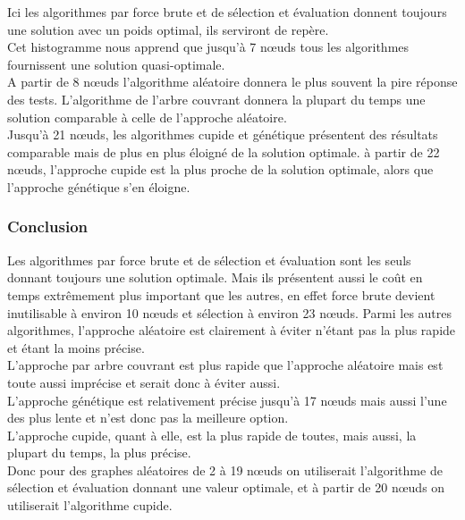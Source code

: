 \documentclass[10pt,a4paper]{report}
\begin{document}
			\begin{flushleft}
			Ici les algorithmes par force brute et de sélection et évaluation donnent toujours une solution avec un poids optimal, ils serviront de repère.\\
			Cet histogramme nous apprend que jusqu'à 7 nœuds tous les algorithmes fournissent une solution quasi-optimale.\\
			A partir de 8 nœuds l'algorithme aléatoire donnera le plus souvent la pire réponse des tests. L'algorithme de l'arbre couvrant donnera la plupart du temps une solution comparable à celle de l'approche aléatoire.\\
			Jusqu'à 21 nœuds, les algorithmes cupide et génétique présentent des résultats comparable mais de plus en plus éloigné de la solution optimale. à partir de 22 nœuds, l'approche cupide est la plus proche de la solution optimale, alors que l'approche génétique s'en éloigne.
			\end{flushleft}
					
		\subsubsection{Conclusion}
		\begin{flushleft}
		Les algorithmes par force brute et de sélection et évaluation sont les seuls donnant toujours une solution optimale. Mais ils présentent aussi le coût en temps extrêmement plus important que les autres, en effet force brute devient inutilisable à environ 10 nœuds et sélection à environ 23 nœuds.
		Parmi les autres algorithmes, l'approche aléatoire est clairement à éviter n'étant pas la plus rapide et étant la moins précise.\\
		L'approche par arbre couvrant est plus rapide que l'approche aléatoire mais est toute aussi imprécise et serait donc à éviter aussi.\\
		L'approche génétique est relativement précise jusqu'à 17 nœuds mais aussi l'une des plus lente et n'est donc pas la meilleure option.\\
		L'approche cupide, quant à elle, est la plus rapide de toutes, mais aussi, la plupart du temps, la plus précise.\\
		
		Donc pour des graphes aléatoires de 2 à 19 nœuds on utiliserait l'algorithme de sélection et évaluation donnant une valeur optimale, et à partir de 20 nœuds on utiliserait l'algorithme cupide.
		\end{flushleft}
			
\end{document}
